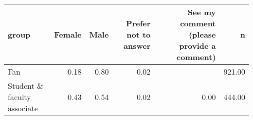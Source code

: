 \begin{tabular}{lrrrrr}
  \hline
group & Female & Male & Prefer not to answer & See my comment (please provide a comment) & n \\ 
  \hline
Fan & 0.18 & 0.80 & 0.02 &  & 921.00 \\ 
  Student \& faculty associate & 0.43 & 0.54 & 0.02 & 0.00 & 444.00 \\ 
   \hline
\end{tabular}
